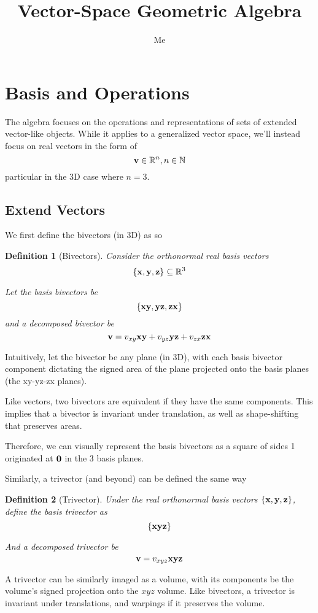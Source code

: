 \documentclass{article}
\title{Vector-Space Geometric Algebra}
\author{Me}
\date{}
\newtheorem{defi}{Definition}[section]
\begin{document}
\maketitle
\newpage


\section{Basis and Operations}
The algebra focuses on the operations and representations of sets of extended vector-like objects. While it applies to a generalized vector space, we'll instead focus on real vectors in the form of
\[
    \vb{v} \in \mathbb{R}^n, n \in \mathbb{N}
\]
particular in the 3D case where $n = 3$.

\subsection{Extend Vectors}
We first define the bivectors (in 3D) as so
\begin{defi}[Bivectors]
    Consider the orthonormal real basis vectors
    \[
    \{\vb x, \vb y, \vb z\} \subseteq \mathbb{R}^3
    \]

    Let the basis bivectors be
    \[
        \{\vb x \vb y, \vb y \vb z, \vb z \vb x\}
    \]
    and a decomposed bivector be
    \[
        \vb v = v_{xy} \vb{xy} + v_{yz} \vb{yz} + v_{zx} \vb{zx}
    \]
\end{defi}
Intuitively, let the bivector be any plane (in 3D), with each basis bivector component dictating the signed area of the plane projected onto the basis planes (the xy-yz-zx planes).

Like vectors, two bivectors are equivalent if they have the same components. This implies that a bivector is invariant under translation, as well as shape-shifting that preserves areas.

Therefore, we can visually represent the basis bivectors as a square of sides 1 originated at $\vb 0$ in the 3 basis planes.

Similarly, a trivector (and beyond) can be defined the same way
\begin{defi}[Trivector]
    Under the real orthonormal basis vectors $\{\vb x, \vb y, \vb z\}$, define the basis trivector as
    \[
        \{\vb {xyz}\}
    \]

    And a decomposed trivector be
    \[
        \vb v = v_{xyz} \vb {xyz}
    \]
\end{defi}

A trivector can be similarly imaged as a volume, with its components be the volume's signed projection onto the $xyz$ volume. Like bivectors, a trivector is invariant under translations, and warpings if it preserves the volume.
\end{document}
